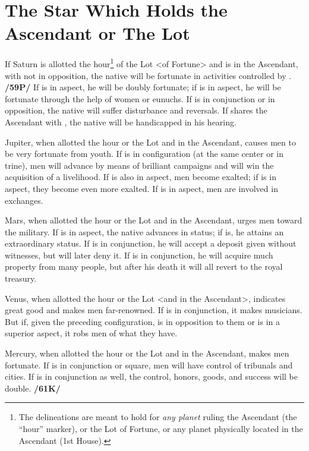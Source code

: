 \section{The Star Which Holds the Ascendant or The Lot}
If  Saturn is allotted the hour\footnote{The delineations are meant to hold for \textit{any planet} ruling the Ascendant (the ``hour'' marker), or the Lot of Fortune, or any planet physically located in the Ascendant (1st House).} of the Lot <of Fortune> and is in the Ascendant, with \Mars\xspace not in opposition, the native will be fortunate in activities controlled by \Saturn. \textbf{/59P/} If \Jupiter\xspace is in aspect, he will be doubly fortunate; if \Venus\xspace is in aspect, he will be fortunate through the help of women or eunuchs. If \Mars\xspace is in conjunction or in opposition, the native will suffer disturbance and reversals. If \Mercury\xspace
shares the Ascendant with \Saturn, the native will be handicapped in his hearing.

Jupiter, when allotted the hour or the Lot and in the Ascendant, causes men to be very fortunate from youth. If \Mars\xspace is in configuration (at the same center or in trine), men will advance by means of brilliant campaigns and will win the acquisition of a livelihood. If \Saturn\xspace is also in aspect, men become exalted; if \Venus\xspace is in aspect, they become even more exalted. If \Mercury\xspace is in aspect, men are involved in exchanges.

 Mars, when allotted the hour or the Lot and in the Ascendant, urges men toward the military. If \Jupiter\xspace is in aspect, the native advances in status; if \Venus\xspace is, he attains an extraordinary status. If \Mercury\xspace is in conjunction, he will accept a deposit given without witnesses, but will later deny it. If \Jupiter\xspace is in conjunction, he will acquire much property from many people, but after his death it will all revert to the royal treasury.

 Venus, when allotted the hour or the Lot <and in the Ascendant>, indicates great good and makes men far-renowned. If \Mercury\xspace is in conjunction, it makes musicians. But if, given the preceding configuration, \Saturn\xspace is in opposition to them or is in a superior aspect, it robs men of what they have.

 Mercury, when allotted the hour or the Lot and in the Ascendant, makes men fortunate. If \Jupiter\xspace is in
conjunction or square, men will have control of tribunals and cities. If \Saturn\xspace is in conjunction as well, the
control, honors, goods, and success will be double. \textbf{/61K/}

